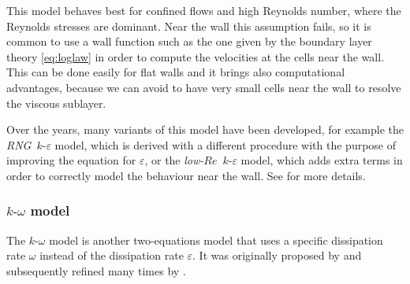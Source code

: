 This model behaves best for confined flows and high Reynolds number, where 
the Reynolds stresses are dominant. Near the wall this assumption fails, so it 
is common to use a wall function such as the one given by the boundary layer 
theory \eqref{eq:loglaw} in order to compute the velocities at the cells near 
the wall. This can be done easily for flat walls and it brings also 
computational advantages, because we can avoid to have very small cells near 
the wall to resolve the viscous sublayer.

Over the years, many variants of this model have been developed, for example 
the \emph{RNG}~$k\text{-}\varepsilon$ model, which is derived with a different 
procedure with the purpose of improving the equation for
$\varepsilon$, or the \emph{low-$Re$}~$k\text{-}\varepsilon$ model, which 
adds extra terms in order to correctly model the behaviour near the wall. See 
\cite{main:vermal} for more details.
%
\subsubsection{$k\text{-}\omega$ model}
The $k\text{-}\omega$ model is another two-equations model that uses a specific 
dissipation rate $\omega$ instead of the dissipation rate $\varepsilon$. It was 
originally proposed by \textcite{komega:kolmo} and subsequently refined many 
times by \textcite{turbo:komega}.


